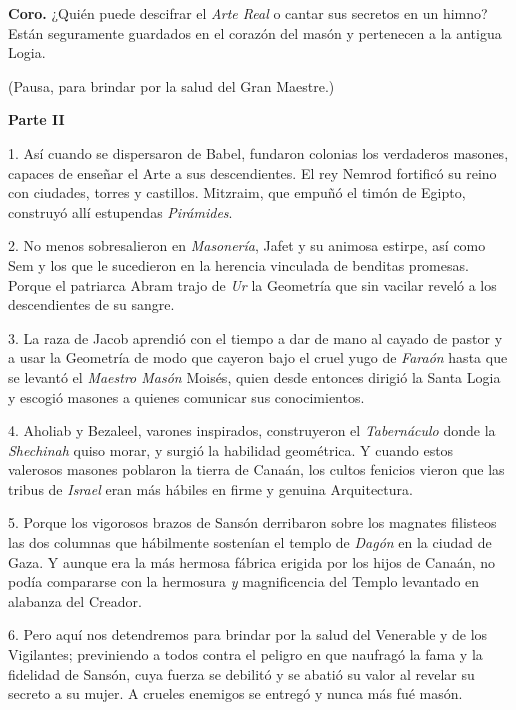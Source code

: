 \documentclass[a4paper,12pt,twoside]{book}
\begin{document}
\noindent \textbf{Coro.} ¿Quién puede descifrar el \textit{Arte Real} o cantar sus secretos en un himno? Están seguramente guardados en el corazón del masón y pertenecen a la antigua Logia.

\noindent (Pausa, para brindar por la salud del Gran Maestre.)

\vspace{0.5cm}

\noindent \textbf{Parte II}

1. Así cuando se dispersaron de Babel, fundaron colonias los verdaderos masones, capaces de enseñar el Arte a sus descendientes. El rey Nemrod fortificó su reino con ciudades, torres y castillos. Mitzraim, que empuñó el timón de Egipto, construyó allí estupendas \textit{Pirámides}.

2. No menos sobresalieron en \textit{Masonería}, Jafet y su animosa estirpe, así como Sem y los que le sucedieron en la herencia vinculada de benditas promesas. Porque el patriarca Abram trajo de \textit{Ur} la Geometría que sin vacilar reveló a los descendientes de su sangre.

3. La raza de Jacob aprendió con el tiempo a dar de mano al cayado de pastor y a usar la Geometría de modo que cayeron bajo el cruel yugo de \textit{Faraón} hasta que se levantó el \textit{Maestro Masón} Moisés, quien desde entonces dirigió la Santa Logia y escogió masones a quienes comunicar sus conocimientos.

4. Aholiab y Bezaleel, varones inspirados, construyeron el \textit{Tabernáculo} donde la \textit{Shechinah} quiso morar, y surgió la habilidad geométrica. Y cuando estos valerosos masones poblaron la tierra de Canaán, los cultos fenicios vieron que las tribus de \textit{Israel} eran más hábiles en firme y genuina Arquitectura.

5. Porque los vigorosos brazos de Sansón derribaron sobre los magnates filisteos las dos columnas que hábilmente sostenían el templo de \textit{Dagón} en la ciudad de Gaza. Y aunque era la más hermosa fábrica erigida por los hijos de Canaán, no podía compararse con la hermosura \textit{y} magnificencia del Templo levantado en alabanza del Creador.

6. Pero aquí nos detendremos para brindar por la salud del Venerable y de los Vigilantes; previniendo a todos contra el peligro en que naufragó la fama y la fidelidad de Sansón, cuya fuerza se debilitó y se abatió su valor al revelar su secreto a su mujer. A crueles enemigos se entregó y nunca más fué masón.
\end{document}
